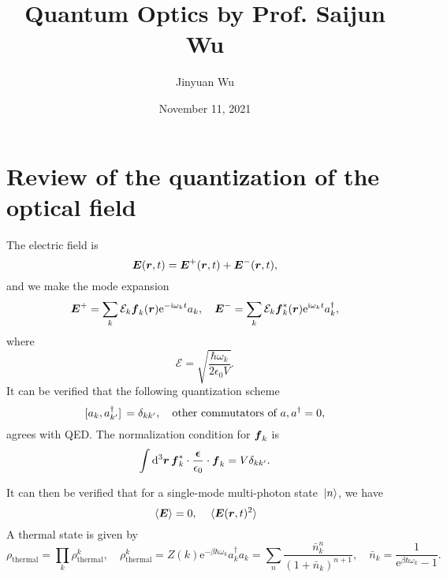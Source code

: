 \documentclass[hyperref, a4paper]{article}
\title{Quantum Optics by Prof. Saijun Wu}
\author{Jinyuan Wu}
\date{November 11, 2021}
\newcommand*{\ii}{\mathrm{i}}
\newcommand*{\ee}{\mathrm{e}}
\begin{document}
\maketitle

\section{Review of the quantization of the optical field}

The electric field is 
\begin{equation}
    \vb*{E}(\vb*{r}, t) = \vb*{E}^+(\vb*{r}, t) + \vb*{E}^-(\vb*{r}, t),
\end{equation}
and we make the mode expansion 
\begin{equation}
    \vb*{E}^+ = \sum_{k} \mathcal{E}_k \vb*{f}_k(\vb*{r}) \ee^{- \ii \omega_k t} a_k, 
    \quad \vb*{E}^- = \sum_{k} \mathcal{E}_k \vb*{f}^*_k(\vb*{r}) \ee^{\ii \omega_k t} a^\dagger_k,
\end{equation}
where 
\begin{equation}
    \mathcal{E} = \sqrt{\frac{\hbar \omega_k}{2 \epsilon_0 V}}.
\end{equation}
It can be verified that the following quantization scheme 
\begin{equation}
    \comm*{a_k}{a^\dagger_{k'}} = \delta_{k k'}, \quad \text{other commutators of $a, a^\dagger$} = 0,
\end{equation}
agrees with QED. The normalization condition for $\vb*{f}_k$ is 
\begin{equation}
    \int \dd[3]{\vb*{r}} \vb*{f}^*_k \cdot \frac{\vb*{\epsilon}}{\epsilon_0} \cdot \vb*{f}_k = V \delta_{k k'}.
\end{equation}

It can then be verified that for a single-mode multi-photon state $\ket*{n}$, we have 
\begin{equation}
    \expval*{\vb*{E}} = 0, \quad \expval*{\vb*{E}(\vb*{r}, t)^2}
\end{equation}
A thermal state is given by
\begin{equation}
    \rho_\text{thermal} = \prod_k \rho^k_\text{thermal}, \quad 
    \rho^k_\text{thermal} = Z(k) \ee^{- \beta \hbar \omega_k} a^\dagger_k a_k = \sum_n \frac{\bar{n}_k^n}{(1 + \bar{n}_k)^{n+1}}, 
    \quad \bar{n}_k = \frac{1}{\ee^{\beta \hbar \omega_k} - 1}.
\end{equation}
\end{document}
